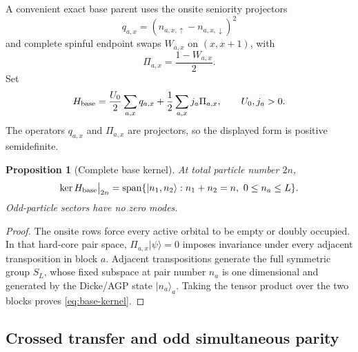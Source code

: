 \documentclass[11pt]{article}
\newtheorem{proposition}[theorem]{Proposition}
\theoremstyle{definition}
\theoremstyle{remark}
\newcommand{\Span}{\operatorname{span}}
\newcommand{\ket}[1]{\lvert #1\rangle}
\begin{document}
A convenient exact base parent uses the onsite seniority projectors
\begin{equation}
 q_{a,x}=(n_{a,x,\uparrow}-n_{a,x,\downarrow})^2
\end{equation}
and complete spinful endpoint swaps $W_{a,x}$ on $(x,x+1)$, with
\begin{equation}
 \Pi_{a,x}=\frac{1-W_{a,x}}2.
\end{equation}
Set
\begin{equation}
 H_{\rm base}=\frac{U_0}{2}\sum_{a,x}q_{a,x}
 +\frac12\sum_{a,x}j_a\Pi_{a,x},
 \qquad U_0,j_a>0.
 \label{eq:Hbase}
\end{equation}
The operators $q_{a,x}$ and $\Pi_{a,x}$ are projectors, so the displayed form is positive semidefinite.

\begin{proposition}[Complete base kernel]
\label{prop:base-kernel}
At total particle number $2n$,
\begin{equation}
 \ker H_{\rm base}\big|_{2n}
 =\Span\{\ket{n_1,n_2}:n_1+n_2=n,\ 0\le n_a\le L\}.
 \label{eq:base-kernel}
\end{equation}
Odd-particle sectors have no zero modes.
\end{proposition}

\begin{proof}
The onsite rows force every active orbital to be empty or doubly occupied.  In that hard-core pair space, $\Pi_{a,x}\ket\psi=0$ imposes invariance under every adjacent transposition in block $a$.  Adjacent transpositions generate the full symmetric group $S_L$, whose fixed subspace at pair number $n_a$ is one dimensional and generated by the Dicke/AGP state $\ket{n_a}_a$.  Taking the tensor product over the two blocks proves \eqref{eq:base-kernel}.
\end{proof}

\subsection{Crossed transfer and odd simultaneous parity}
\end{document}
